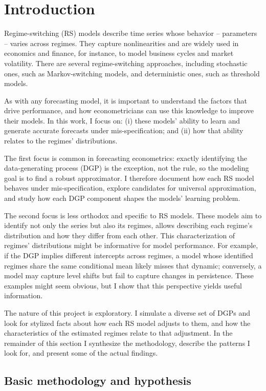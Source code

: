 \documentclass[
  letterpaper,
  DIV=11,
  numbers=noendperiod]{scrartcl}
\numberwithin{equation}{section}
\numberwithin{table}{section}
\numberwithin{figure}{section}
\let\oldsection\section
\renewcommand\section{\clearpage\oldsection}
\begin{document}
\section{Introduction}\label{sec-intro}

Regime-switching (RS) models describe time series whose behavior --
parameters -- varies across regimes. They capture nonlinearities and are
widely used in economics and finance, for instance, to model business
cycles and market volatility. There are several regime-switching
approaches, including stochastic ones, such as Markov-switching models,
and deterministic ones, such as threshold models.

As with any forecasting model, it is important to understand the factors
that drive performance, and how econometricians can use this knowledge
to improve their models. In this work, I focus on: (i) these models'
ability to learn and generate accurate forecasts under
mis-specification; and (ii) how that ability relates to the regimes'
distributions.

The first focus is common in forecasting econometrics: exactly
identifying the data-generating process (DGP) is the exception, not the
rule, so the modeling goal is to find a robust approximator. I therefore
document how each RS model behaves under mis-specification, explore
candidates for universal approximation, and study how each DGP component
shapes the models' learning problem.

The second focus is less orthodox and specific to RS models. These
models aim to identify not only the series but also its regimes, allows
describing each regime's distribution and how they differ from each
other. This characterization of regimes' distributions might be
informative for model performance. For example, if the DGP implies
different intercepts across regimes, a model whose identified regimes
share the same conditional mean likely misses that dynamic; conversely,
a model may capture level shifts but fail to capture changes in
persistence. These examples might seem obvious, but I show that this
perspective yields useful information.

The nature of this project is exploratory. I simulate a diverse set of
DGPs and look for stylized facts about how each RS model adjusts to
them, and how the characteristics of the estimated regimes relate to
that adjustment. In the remainder of this section I synthesize the
methodology, describe the patterns I look for, and present some of the
actual findings.

\subsection{Basic methodology and hypothesis}\label{sec-intro-method}
\end{document}

